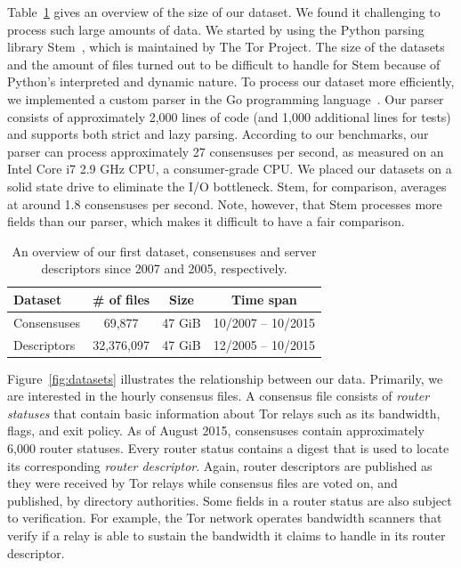 Table~\ref{tab:collector-dataset} gives an overview of the size of our dataset.
We found it challenging to process such large amounts of data.  We started by
using the Python parsing library Stem~\cite{stem}, which is maintained by The
Tor Project.  The size of the datasets and the amount of files turned out to be
difficult to handle for Stem because of Python's interpreted and dynamic nature.
To process our dataset more efficiently, we implemented a custom parser in the
Go programming language~\cite{zoossh}.  Our parser consists of approximately
2,000 lines of code (and 1,000 additional lines for tests) and supports both
strict and lazy parsing.  According to our benchmarks, our parser can process
approximately 27 consensuses per second, as measured on an Intel Core i7 2.9 GHz
CPU, a consumer-grade CPU.  We placed our datasets on a solid state drive to
eliminate the I/O bottleneck.  Stem, for comparison, averages at around 1.8
consensuses per second.  Note, however, that Stem processes more fields than our
parser, which makes it difficult to have a fair comparison.

\begin{table}[t]
\centering
\begin{tabular}{l c c c}
\textbf{Dataset} & \textbf{\# of files} & \textbf{Size} & \textbf{Time span} \\
\hline
Consensuses & 69,877 & 47 GiB & 10/2007 -- 10/2015 \\
Descriptors & 32,376,097 & 47 GiB & 12/2005 -- 10/2015 \\
\end{tabular}
\caption{An overview of our first dataset, consensuses and server descriptors
since 2007 and 2005, respectively.}
\label{tab:collector-dataset}
\end{table}

Figure~\ref{fig:datasets} illustrates the relationship between our data.
Primarily, we are interested in the hourly consensus files.  A consensus file
consists of \emph{router statuses} that contain basic information about Tor
relays such as its bandwidth, flags, and exit policy.  As of August 2015,
consensuses contain approximately 6,000 router statuses.  Every router status
contains a digest that is used to locate its corresponding \emph{router
descriptor}.  Again, router descriptors are published as they were received by
Tor relays while consensus files are voted on, and published, by directory
authorities.  Some fields in a router status are also subject to verification.
For example, the Tor network operates bandwidth scanners that verify if a relay
is able to sustain the bandwidth it claims to handle in its router descriptor.

